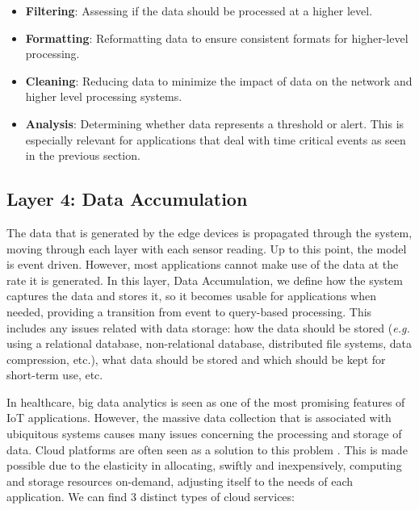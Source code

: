 \begin{itemize}
    \item \textbf{Filtering}: Assessing if the data should be processed at a higher level. 
    \item \textbf{Formatting}: Reformatting data to ensure consistent formats for higher-level processing.
    \item \textbf{Cleaning}: Reducing data to minimize the impact of data on the network and higher level processing systems.
    \item \textbf{Analysis}: Determining whether data represents a threshold or alert. This is especially relevant for applications that deal with time critical events as seen in the previous section.
\end{itemize}

\subsection{Layer 4: Data Accumulation}
\label{sec:iot-model-layer4}


The data that is generated by the edge devices is propagated through the system, moving through each layer with each sensor reading. Up to this point, the model is event driven. However, most applications cannot make use of the data at the rate it is generated. In this layer, Data Accumulation, we define how the system captures the data and stores it, so it becomes usable for applications when needed, providing a transition from event to query-based processing. This includes any issues related with data storage: how the data should be stored (\textit{e.g.} using a relational database, non-relational database, distributed file systems, data compression, etc.), what data should be stored and which should be kept for short-term use, etc.

In healthcare, big data analytics is seen as one of the most promising features of \acs{IoT} applications. However, the massive data collection that is associated with ubiquitous systems causes many issues concerning the processing and storage of data. Cloud platforms are often seen as a solution to this problem \cite{Baker2017}. This is made possible due to the elasticity in allocating, swiftly and inexpensively, computing and storage resources on-demand, adjusting itself to the needs of each application. We can find 3 distinct types of cloud services:

